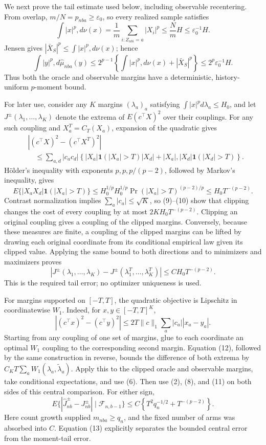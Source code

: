 We next prove the tail estimate used below, including observable recentering. From overlap, \(m/N=p_{nba}\ge\varepsilon_0\), so every realized sample satisfies
\[
\int|x|^p,d\nu(x)=\frac1m\sum_{i:Z_{nbi}=a}|X_i|^p
\le\frac NmH\le\varepsilon_0^{-1}H.
\tag{7}
\]
Jensen gives \(|\bar X_S|^p\le\int|x|^p,d\nu(x)\); hence
\[
\int|y|^p,d\widehat\mu_{nba}(y)
\le2^{p-1}\left\{\int|x|^p,d\nu(x)+|\bar X_S|^p\right\}
\le2^p\varepsilon_0^{-1}H.
\tag{8}
\]
Thus both the oracle and observable margins have a deterministic, history-uniform \(p\)-moment bound.

For later use, consider any \(K\) margins \((\lambda_a)_a\) satisfying \(\int|x|^p d\lambda_a\le H_0\), and let \(J^\pm(\lambda_1,\ldots,\lambda_K)\) denote the extrema of \(E(c^\top X)^2\) over their couplings. For any such coupling and \(X_a^T=C_T(X_a)\), expansion of the quadratic gives
\[
\begin{aligned}
&|(c^\top X)^2-(c^\top X^T)^2|\\
&\quad\le\sum_{a,d}|c_ac_d|\left\{
|X_a|\mathbf1(|X_a|>T)|X_d|+|X_a|,|X_d|\mathbf1(|X_d|>T)\right\}.
\end{aligned}
\tag{9}
\]
Hölder's inequality with exponents \(p,p,p/(p-2)\), followed by Markov's inequality, gives
\[
E\{|X_aX_d|\mathbf1(|X_a|>T)\}
\le H_0^{1/p}H_0^{1/p}\Pr(|X_a|>T)^{(p-2)/p}
\le H_0T^{-(p-2)}.
\tag{10}
\]
Contrast normalization implies \(\sum_a|c_a|\le\sqrt K\), so (9)--(10) show that clipping changes the cost of every coupling by at most \(2KH_0T^{-(p-2)}\). Clipping an original coupling gives a coupling of the clipped margins. Conversely, because these measures are finite, a coupling of the clipped margins can be lifted by drawing each original coordinate from its conditional empirical law given its clipped value. Applying the same bound to both directions and to minimizers and maximizers proves
\[
|J^\pm(\lambda_1,\ldots,\lambda_K)-J^\pm(\lambda_1^T,\ldots,\lambda_K^T)|
\le C H_0T^{-(p-2)}.
\tag{11}
\]
This is the required tail error; no optimizer uniqueness is used.

For margins supported on \([-T,T]\), the quadratic objective is Lipschitz in coordinatewise \(W_1\). Indeed, for \(x,y\in[-T,T]^K\),
\[
|(c^\top x)^2-(c^\top y)^2|
\le2T\|c\|_1\sum_a|c_a||x_a-y_a|.
\tag{12}
\]
Starting from any coupling of one set of margins, glue to each coordinate an optimal \(W_1\) coupling to the corresponding second margin. Equation (12), followed by the same construction in reverse, bounds the difference of both extrema by \(C_KT\sum_aW_1(\lambda_a,\widetilde\lambda_a)\). Apply this to the clipped oracle and observable margins, take conditional expectations, and use (6). Then use (2), (8), and (11) on both sides of this central comparison. For either sign,
\[
E\{|\widehat J_{nb}^{\pm}-J_{nb}^{\pm}|\mid\mathcal F_{n,b-1}\}
\le C\left\{T^2q_n^{-1/2}+T^{-(p-2)}\right\}.
\tag{13}
\]
Here count growth supplied \(m_{nba}\ge q_n\), and the fixed number of arms was absorbed into \(C\). Equation (13) explicitly separates the bounded central error from the moment-tail error.

